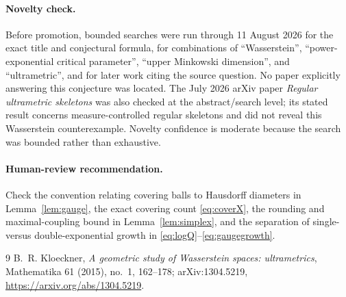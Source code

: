 \documentclass[11pt]{article}
\begin{document}
\paragraph{Novelty check.}
Before promotion, bounded searches were run through 11 August 2026 for the
exact title and conjectural formula, for combinations of ``Wasserstein'',
``power-exponential critical parameter'', ``upper Minkowski dimension'', and
``ultrametric'', and for later work citing the source question.  No paper
explicitly answering this conjecture was located.  The July 2026 arXiv paper
\emph{Regular ultrametric skeletons} was also checked at the abstract/search
level; its stated result concerns measure-controlled regular skeletons and
did not reveal this Wasserstein counterexample.  Novelty confidence is
moderate because the search was bounded rather than exhaustive.

\paragraph{Human-review recommendation.}
Check the convention relating covering balls to Hausdorff diameters in
Lemma~\ref{lem:gauge}, the exact covering count \eqref{eq:coverX}, the rounding
and maximal-coupling bound in Lemma~\ref{lem:simplex}, and the separation of
single- versus double-exponential growth in \eqref{eq:logQ}--\eqref{eq:gaugegrowth}.

\begin{thebibliography}{9}
B.~R. Kloeckner,
\emph{A geometric study of Wasserstein spaces: ultrametrics},
Mathematika 61 (2015), no.~1, 162--178;
arXiv:1304.5219,
\url{https://arxiv.org/abs/1304.5219}.
\end{thebibliography}
\end{document}
